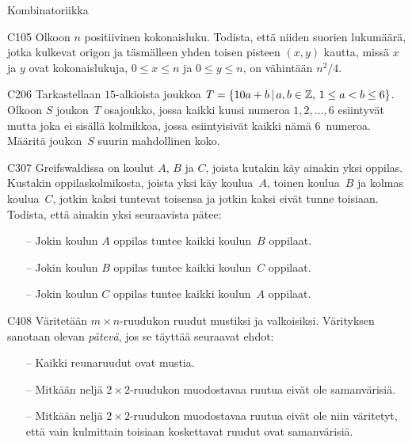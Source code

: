 \begin{bwField}{Kombinatoriikka}

\begin{bwProblem}{C}{1}{05}
Olkoon $n$ positiivinen kokonaisluku.  Todista, että
niiden suorien lukumäärä, jotka kulkevat origon ja täsmälleen
yhden toisen pisteen $(x,y)$ kautta, missä $x$ ja $y$ ovat
kokonaislukuja, $0\le x\le n$ ja $0\le y\le n$, on
vähintään $n^2/4$.
\end{bwProblem}

\begin{bwProblem}{C}{2}{06}
Tarkastellaan $15$-alkioista joukkoa 
$T=\{10a+b \,|\, a,b\in\mathbb{Z},\,1\le a<b\le 6\}$.  
Olkoon $S$ joukon~$T$ osajoukko, jossa kaikki
kuusi numeroa $1,2,\ldots,6$ esiintyvät mutta joka ei sisällä
kolmikkoa, jossa esiintyisivät kaikki nämä $6$~numeroa.  Määritä
joukon~$S$ suurin mahdollinen koko.
\end{bwProblem}

\begin{bwProblem}{C}{3}{07}
Greifswaldissa on koulut $A$, $B$ ja $C$, joista kutakin käy
ainakin yksi oppilas.  Kustakin oppilaskolmikosta, joista yksi
käy koulua~$A$, toinen koulua~$B$ ja kolmas koulua~$C$,
jotkin kaksi tuntevat toisensa ja jotkin kaksi eivät tunne
toisiaan.  Todista, että ainakin yksi seuraavista pätee:
\begin{itemize}
\item[--]
Jokin koulun $A$ oppilas tuntee kaikki koulun~$B$ oppilaat.

\item[--]
Jokin koulun $B$ oppilas tuntee kaikki koulun~$C$ oppilaat.

\item[--]
Jokin koulun $C$ oppilas tuntee kaikki koulun~$A$ oppilaat.
\end{itemize}

\end{bwProblem}

\begin{bwProblem}{C}{4}{08}
Väritetään $m\times n$-ruudukon ruudut mustiksi ja valkoisiksi.
Värityksen sanotaan olevan \emph{pätevä}, jos se täyttää
seuraavat ehdot:
\begin{itemize}
\item[--] 
Kaikki reunaruudut ovat mustia.

\item[--]
Mitkään neljä $2\times 2$-ruudukon muodostavaa ruutua eivät ole
samanvärisiä.

\item[--]
Mitkään neljä $2\times 2$-ruudukon muodostavaa ruutua eivät ole
niin väritetyt, että vain kulmittain toisiaan koskettavat ruudut
ovat samanvärisiä.
\end{itemize}


\end{bwProblem}
\end{bwField}
